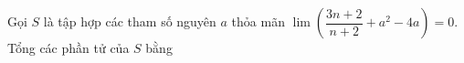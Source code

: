 \begin{ex}
Gọi $S$ là tập hợp các tham số nguyên $a$ thỏa mãn $\lim\left(\dfrac{3n+2}{n+2}+a^2-4a\right)=0$. Tổng các phần tử của $S$ bằng
\end{ex}
